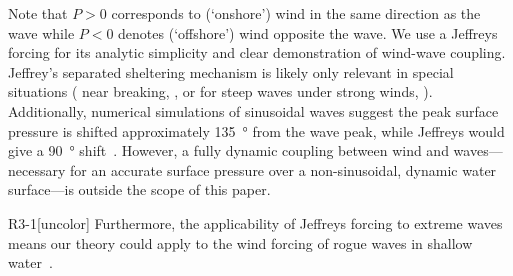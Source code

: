 \documentclass{jfm}
\begin{document}
Note that $P>0$ corresponds to (`onshore') wind in the same direction as
the wave while $P<0$ denotes (`offshore') wind opposite the wave. We use
a Jeffreys forcing for its analytic simplicity and clear demonstration
of wind-wave coupling.
Jeffrey's separated sheltering mechanism is likely only relevant
in special situations (\eg{} near breaking,
\citealp{banner1976separation}, or for steep waves under strong winds,
\citealp{tian2013evolution,touboul2006interaction}).
Additionally, numerical simulations of sinusoidal waves suggest the peak
surface pressure is shifted approximately \SI{135}{\degree} from the
wave peak, while Jeffreys would give a \SI{90}{\degree}
shift~\citep{husain2019boundary}.
However, a fully dynamic coupling between wind and waves---necessary for
an accurate surface pressure over a non-sinusoidal, dynamic water
surface---is outside the scope of this paper.
\begin{LineLabel}{R3-1}[uncolor]
Furthermore, the applicability of Jeffreys forcing to extreme waves
means our theory could apply to the wind forcing of rogue waves in
shallow water~\citep{kharif2008influence}.
\end{LineLabel}
\end{document}
